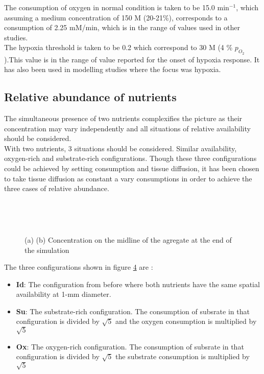 \documentclass[11pt,a4paper]{article}
\begin{document}
The consumption of oxygen in normal condition is taken to be 15.0 min$^{-1}$, which assuming a medium concentration of 150 \textmu M (20-21\%), corresponds to a consumption of 2.25 mM/min, which is in the range of values used in other studies.\cite{Kempf2005}\cite{Mao2018} \\

The hypoxia threshold is taken to be 0.2 which correspond to 30 \textmu M (4 \% $p_{O_{2}}$).This value is in the range of value reported for the onset of hypoxia response.\cite{McKeown2014}\cite{Saxena2019} It has also been used in modelling studies where the focus was hypoxia.\cite{Bull2020}\cite{Kempf2015}

\subsection{Relative abundance of nutrients}
The simultaneous presence of two nutrients complexifies the picture as their concentration may vary independently and all situations of relative availability should be considered.\\

With two nutrients, 3 situations should be considered. Similar availability, oxygen-rich and substrate-rich configurations. Though these three configurations could be achieved by setting consumption and tissue diffusion, it has been chosen to take tissue diffusion as constant a vary consumptions in order to achieve the three cases of relative abundance.\\

\begin{figure}[ht!]
\begin{subfigure}{0.32\textwidth}
	\centering
	
	\caption{ \label{ref_mid_Id}}
\end{subfigure}
~
\begin{subfigure}{0.32\textwidth}
	\centering
	
	\caption{\label{ref_mid_Gl}}
\end{subfigure}
~
\begin{subfigure}{0.32\textwidth}
	\centering
	
	\caption{\label{ref_mid_Ox}}
\end{subfigure}
\caption{(a)  (b) Concentration on the midline of the agregate at the end of the simulation \label{ref_mid}}
\end{figure}

The three configurations shown in figure \ref{ref_mid} are : 
\begin{itemize}
\item \textbf{Id}: The configuration from before where both nutrients have the same spatial availability at 1-mm diameter.
\item \textbf{Su}: The substrate-rich configuration. The consumption of subsrate in that configuration is divided by $\sqrt{5}$ and the oxygen consumption is multiplied by $\sqrt{5}$
\item \textbf{Ox}: The oxygen-rich configuration. The consumption of subsrate in that configuration is divided by $\sqrt{5}$ the substrate consumption is multiplied by $\sqrt{5}$
\end{itemize}
\end{document}
